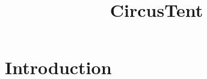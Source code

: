 \documentclass{article}
\title{CircusTent}
\begin{document}
\maketitle

\section{Introduction}
\end{document}
